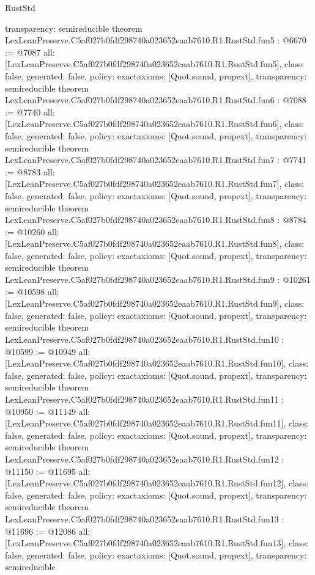 \begin{lexlean}{RustStd}
\begin{coremodule}
{  transparency: semireducible
}
theorem LexLeanPreserve.C5af027b0fdf298740a023652eaab7610.R1.RustStd.fun5 : @6670 := @7087 {
  all: [LexLeanPreserve.C5af027b0fdf298740a023652eaab7610.R1.RustStd.fun5],
  class: false,
  generated: false,
  policy: exact{axioms: [Quot.sound, propext]},
  transparency: semireducible
}
theorem LexLeanPreserve.C5af027b0fdf298740a023652eaab7610.R1.RustStd.fun6 : @7088 := @7740 {
  all: [LexLeanPreserve.C5af027b0fdf298740a023652eaab7610.R1.RustStd.fun6],
  class: false,
  generated: false,
  policy: exact{axioms: [Quot.sound, propext]},
  transparency: semireducible
}
theorem LexLeanPreserve.C5af027b0fdf298740a023652eaab7610.R1.RustStd.fun7 : @7741 := @8783 {
  all: [LexLeanPreserve.C5af027b0fdf298740a023652eaab7610.R1.RustStd.fun7],
  class: false,
  generated: false,
  policy: exact{axioms: [Quot.sound, propext]},
  transparency: semireducible
}
theorem LexLeanPreserve.C5af027b0fdf298740a023652eaab7610.R1.RustStd.fun8 : @8784 := @10260 {
  all: [LexLeanPreserve.C5af027b0fdf298740a023652eaab7610.R1.RustStd.fun8],
  class: false,
  generated: false,
  policy: exact{axioms: [Quot.sound, propext]},
  transparency: semireducible
}
theorem LexLeanPreserve.C5af027b0fdf298740a023652eaab7610.R1.RustStd.fun9 : @10261 := @10598 {
  all: [LexLeanPreserve.C5af027b0fdf298740a023652eaab7610.R1.RustStd.fun9],
  class: false,
  generated: false,
  policy: exact{axioms: [Quot.sound, propext]},
  transparency: semireducible
}
theorem LexLeanPreserve.C5af027b0fdf298740a023652eaab7610.R1.RustStd.fun10 : @10599 := @10949 {
  all: [LexLeanPreserve.C5af027b0fdf298740a023652eaab7610.R1.RustStd.fun10],
  class: false,
  generated: false,
  policy: exact{axioms: [Quot.sound, propext]},
  transparency: semireducible
}
theorem LexLeanPreserve.C5af027b0fdf298740a023652eaab7610.R1.RustStd.fun11 : @10950 := @11149 {
  all: [LexLeanPreserve.C5af027b0fdf298740a023652eaab7610.R1.RustStd.fun11],
  class: false,
  generated: false,
  policy: exact{axioms: [Quot.sound, propext]},
  transparency: semireducible
}
theorem LexLeanPreserve.C5af027b0fdf298740a023652eaab7610.R1.RustStd.fun12 : @11150 := @11695 {
  all: [LexLeanPreserve.C5af027b0fdf298740a023652eaab7610.R1.RustStd.fun12],
  class: false,
  generated: false,
  policy: exact{axioms: [Quot.sound, propext]},
  transparency: semireducible
}
theorem LexLeanPreserve.C5af027b0fdf298740a023652eaab7610.R1.RustStd.fun13 : @11696 := @12086 {
  all: [LexLeanPreserve.C5af027b0fdf298740a023652eaab7610.R1.RustStd.fun13],
  class: false,
  generated: false,
  policy: exact{axioms: [Quot.sound, propext]},
  transparency: semireducible
}
\end{coremodule}
\end{lexlean}

